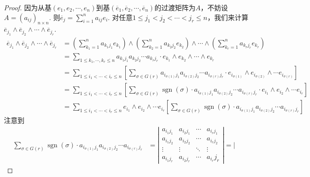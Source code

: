 \begin{proof}
因为从基$(e_{1},e_{2},\cdots,e_{n})$到基$(\overline{e}_{1},\overline{e}_{2},\cdots,\overline{e}_{n})$的过渡矩阵为$A$，不妨设$A=(a_{ij})_{n\times n}$. 则$\overline{e}_{j}=\sum\limits_{i=1}^{n}a_{ij}e_{i}$. 对任意$1\leqslant j_{1}<j_{2}<\cdots <j_{r}\leqslant n$，我们来计算$\overline{e}_{j_{1}}\wedge \overline{e}_{j_{2}}\wedge\cdots\wedge \overline{e}_{j_{r}}$.
\[
\begin{split}
	\overline{e}_{j_{1}}\wedge \overline{e}_{j_{2}}\wedge\cdots\wedge \overline{e}_{j_{r}}&=\left( \sum_{k_{1}=1}^{n}a_{k_{1}j_{1}}e_{k_{1}} \right)\wedge \left( \sum_{k_{2}=1}^{n}a_{k_{2}j_{2}}e_{k_{2}} \right)\wedge\cdots\wedge \left( \sum_{k_{r}=1}^{n}a_{k_{r}j_{r}}e_{k_{r}} \right)\\
	&=\sum_{1\leqslant k_{1},\cdots,k_{r}\leqslant n}a_{k_{1}j_{1}}a_{k_{2}j_{2}}\cdots a_{k_{r}j_{r}}\cdot e_{k_{1}}\wedge e_{k_{2}}\wedge \cdots \wedge e_{k_{r}}\\
	&=\sum_{1\leqslant i_{1}<\cdots< i_{r}\leqslant n}\left[\sum_{\sigma\in G(r)}a_{i_{\sigma(1)}j_{1}}a_{i_{\sigma(2)}j_{2}}\cdots a_{i_{\sigma(r)}j_{r}}\cdot e_{i_{\sigma(1)}}\wedge e_{i_{\sigma(2)}}\wedge \cdots e_{i_{\sigma(r)}}\right]\\
	&=\sum_{1\leqslant i_{1}<\cdots< i_{r}\leqslant n}\left[\sum_{\sigma\in G(r)}\operatorname{sgn}(\sigma)\cdot  a_{i_{\sigma(1)}j_{1}}a_{i_{\sigma(2)}j_{2}}\cdots a_{i_{\sigma(r)}j_{r}}\cdot  e_{i_{1}}\wedge e_{i_{2}}\wedge \cdots e_{i_{r}}\right]\\
	&=\sum_{1\leqslant i_{1}<\cdots< i_{r}\leqslant n}e_{i_{1}}\wedge e_{i_{2}}\wedge \cdots e_{i_{r}}\left[\sum_{\sigma\in G(r)}\operatorname{sgn}(\sigma)\cdot  a_{i_{\sigma(1)}j_{1}}a_{i_{\sigma(2)}j_{2}}\cdots a_{i_{\sigma(r)}j_{r}}  \right]
\end{split}
\]
注意到
\[
\begin{split}
	\sum_{\sigma\in G(r)}\operatorname{sgn}(\sigma)\cdot  a_{i_{\sigma(1)}j_{1}}a_{i_{\sigma(2)}j_{2}}\cdots a_{i_{\sigma(r)}j_{r}}&=\left|\begin{array}{cccc}
		a_{i_{1} j_{1}} & a_{i_{2} j_{1}} & \cdots & a_{i_{r} j_{1}} \\
		a_{i_{1} j_{2}} & a_{i_{2} j_{2}} & \cdots & a_{i_{r} j_{2}} \\
		\vdots & \vdots & \ddots & \vdots \\
		a_{i_{1} j_{r}} & a_{i_{2} j_{r}} & \cdots & a_{i_{r}} j_{r}
		\end{array}\right|=\left|\begin{array}{cccc}

\end{array}
\end{split}\]
\end{proof}
